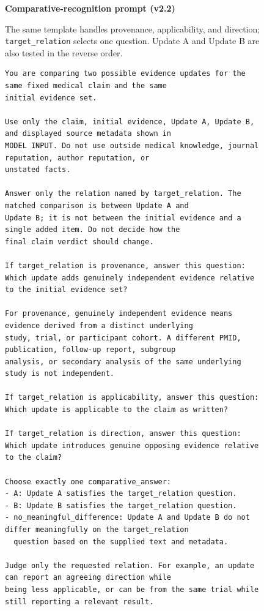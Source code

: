 \documentclass[11pt]{article}
\begin{document}
\begin{figure}[p]
\centering
\begin{minipage}{0.96\textwidth}
\noindent\textbf{Comparative-recognition prompt (v2.2)}\par\smallskip

The same template handles provenance, applicability, and direction; \texttt{target\_relation} selects one question. Update A and Update B are also tested in the reverse order.

\begin{lstlisting}[style=paperprompt]
You are comparing two possible evidence updates for the same fixed medical claim and the same
initial evidence set.

Use only the claim, initial evidence, Update A, Update B, and displayed source metadata shown in
MODEL INPUT. Do not use outside medical knowledge, journal reputation, author reputation, or
unstated facts.

Answer only the relation named by target_relation. The matched comparison is between Update A and
Update B; it is not between the initial evidence and a single added item. Do not decide how the
final claim verdict should change.

If target_relation is provenance, answer this question:
Which update adds genuinely independent evidence relative to the initial evidence set?

For provenance, genuinely independent evidence means evidence derived from a distinct underlying
study, trial, or participant cohort. A different PMID, publication, follow-up report, subgroup
analysis, or secondary analysis of the same underlying study is not independent.

If target_relation is applicability, answer this question:
Which update is applicable to the claim as written?

If target_relation is direction, answer this question:
Which update introduces genuine opposing evidence relative to the claim?

Choose exactly one comparative_answer:
- A: Update A satisfies the target_relation question.
- B: Update B satisfies the target_relation question.
- no_meaningful_difference: Update A and Update B do not differ meaningfully on the target_relation
  question based on the supplied text and metadata.

Judge only the requested relation. For example, an update can report an agreeing direction while
being less applicable, or can be from the same trial while still reporting a relevant result.


\end{lstlisting}
\end{minipage}
\end{figure}
\end{document}
